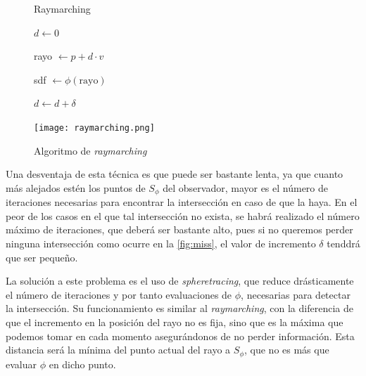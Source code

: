 \begin{figure}[ht!]
    \centering
    \begin{minipage}{0.50\textwidth}
        \begin{algorithm}[H]
            \caption{Raymarching}
                
                $d \gets 0$ 
                
                 {
                    rayo $\gets p +d\cdot v$
                    
                    sdf $\gets \phi(\text{rayo})$
                    
            
                    $d\gets d + \delta$\;
            
                }
        \end{algorithm}
    \end{minipage}%
    \hfill
    \begin{minipage}{0.48\textwidth}
        \texttt{[image: raymarching.png]}
    \end{minipage}
    \caption{Algoritmo de \textit{raymarching}}
    \label{a:raymarching}
\end{figure}

Una desventaja de esta técnica es que puede ser bastante lenta, ya que cuanto más alejados estén los puntos de $S_\phi$ del observador, mayor es el número de iteraciones necesarias para encontrar la intersección en caso de que la haya. En el peor de los casos en el que tal intersección no exista, se habrá realizado el número máximo de iteraciones, que deberá ser bastante alto, pues si no queremos perder ninguna intersección como ocurre en la \autoref{fig:miss}, el valor de incremento $\delta$ tenddrá que ser pequeño.\newline

La solución a este problema es el uso de \textit{spheretracing}, que reduce drásticamente el número de iteraciones y por tanto evaluaciones de $\phi$, necesarias para detectar la intersección. Su funcionamiento es similar al \textit{raymarching}, con la diferencia de que el incremento en la posición del rayo no es fija, sino que es la máxima que podemos tomar en cada momento asegurándonos de no perder información. Esta distancia será la mínima del punto actual del rayo a $S_\phi$, que no es más que evaluar $\phi$ en dicho punto.\newline

